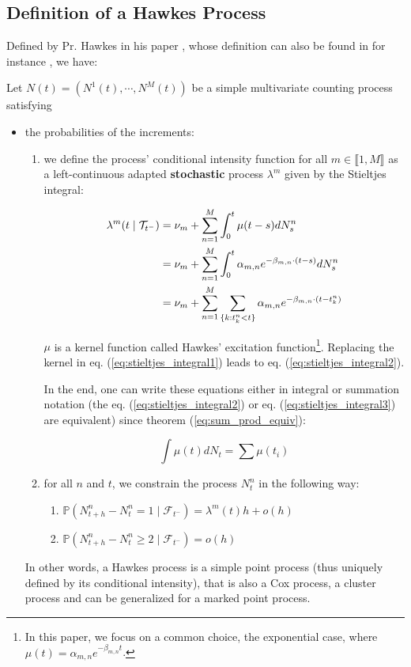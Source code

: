 \subsection{Definition of a Hawkes Process}
Defined by Pr. Hawkes in his paper \cite{Hawkes}, whose definition can also be found in for instance \cite{Chen}, we have:
\begin{definition}
Let $N(t) = \left ( N^1(t), \cdots , N^M(t) \right )$ be a simple multivariate counting process satisfying 

\begin{itemize}
\setlength{\itemindent}{2 cm}
\item the probabilities of the increments:
\begin{enumerate}
\setlength{\itemindent}{3 cm}
\item we define the process' conditional intensity function for all $m \in \llbracket 1, M \rrbracket$ as a left-continuous adapted \textbf{stochastic} process  $\lambda^m$ given by the Stieltjes integral:

\begin{align}
\lambda^m (t \mid \mathcal{T}_{t^-} ) &= 
\nu_m + \sum_{n = 1}^M \int_0^t \mu( t - s ) d N^n_s  \label{eq:stieltjes_integral1} \\
&= \nu_m + \sum_{n = 1}^M \int_0^t \alpha_{m,n} e^{- \beta_{m,n} \cdot ( t - s ) } d N^n_s  \label{eq:stieltjes_integral2} \\
&= \nu_m + \sum_{n = 1}^M \sum_{ \{k: t_k^n < t \}} \alpha_{m,n} e^{- \beta_{m,n} \cdot ( t - t_k^n ) } \label{eq:stieltjes_integral3}
\end{align}

$ \mu $ is a kernel function called Hawkes' excitation function\footnote{In this paper, we focus on a common choice, the exponential case, where $\mu(t) = \alpha_{m,n} e^{- \beta_{m,n}  t  }$.}. Replacing the kernel in eq. (\ref{eq:stieltjes_integral1}) leads to eq. (\ref{eq:stieltjes_integral2}).


In the end, one can write these equations either in integral or summation notation (the eq. (\ref{eq:stieltjes_integral2}) or eq. (\ref{eq:stieltjes_integral3}) are equivalent) since theorem (\ref{eq:sum_prod_equiv}):

$$ \int \mu(t) dN_t = \sum \mu(t_i) $$
 

\item  for all $n$ and $t$, we constrain the process $N^n_t$ in the following way:

\begin{enumerate}
\setlength{\itemindent}{4 cm}
\item $\mathbb P( N^n_{t+h} - N^n_{t} = 1 \mid \mathcal F_{t^-} ) = \lambda^m (t) h + o(h)$
\item $\mathbb P( N^n_{t+h} - N^n_{t} \geq 2 \mid \mathcal F_{t^-} ) =  o(h)$
\end{enumerate}
\end{enumerate}
In other words, a Hawkes process is a simple point process (thus uniquely defined by its conditional intensity), that is also a Cox process, a cluster process and can be generalized for a marked point process. 



\end{itemize}
\end{definition}
